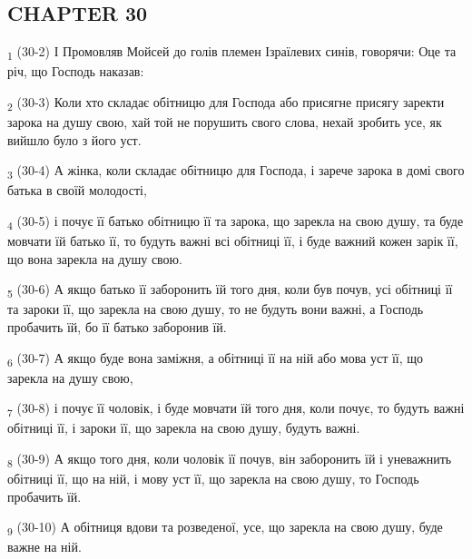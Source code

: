 \subsection{CHAPTER 30}
\begin{tcolorbox}
\textsubscript{1} (30-2) І Промовляв Мойсей до голів племен Ізраїлевих синів, говорячи: Оце та річ, що Господь наказав:
\end{tcolorbox}
\begin{tcolorbox}
\textsubscript{2} (30-3) Коли хто складає обітницю для Господа або присягне присягу заректи зарока на душу свою, хай той не порушить свого слова, нехай зробить усе, як вийшло було з його уст.
\end{tcolorbox}
\begin{tcolorbox}
\textsubscript{3} (30-4) А жінка, коли складає обітницю для Господа, і зарече зарока в домі свого батька в своїй молодості,
\end{tcolorbox}
\begin{tcolorbox}
\textsubscript{4} (30-5) і почує її батько обітницю її та зарока, що зарекла на свою душу, та буде мовчати їй батько її, то будуть важні всі обітниці її, і буде важний кожен зарік її, що вона зарекла на душу свою.
\end{tcolorbox}
\begin{tcolorbox}
\textsubscript{5} (30-6) А якщо батько її заборонить їй того дня, коли був почув, усі обітниці її та зароки її, що зарекла на свою душу, то не будуть вони важні, а Господь пробачить їй, бо її батько заборонив їй.
\end{tcolorbox}
\begin{tcolorbox}
\textsubscript{6} (30-7) А якщо буде вона заміжня, а обітниці її на ній або мова уст її, що зарекла на душу свою,
\end{tcolorbox}
\begin{tcolorbox}
\textsubscript{7} (30-8) і почує її чоловік, і буде мовчати їй того дня, коли почує, то будуть важні обітниці її, і зароки її, що зарекла на свою душу, будуть важні.
\end{tcolorbox}
\begin{tcolorbox}
\textsubscript{8} (30-9) А якщо того дня, коли чоловік її почув, він заборонить їй і уневажнить обітниці її, що на ній, і мову уст її, що зарекла на свою душу, то Господь пробачить їй.
\end{tcolorbox}
\begin{tcolorbox}
\textsubscript{9} (30-10) А обітниця вдови та розведеної, усе, що зарекла на свою душу, буде важне на ній.
\end{tcolorbox}
